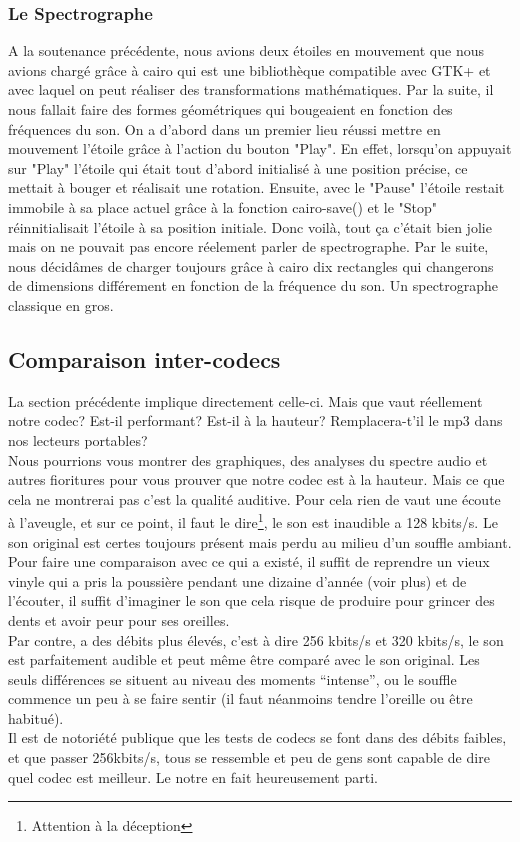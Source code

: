\documentclass[a4paper,12pt]{report}
\begin{document}
\subsubsection{Le Spectrographe}
A la soutenance précédente, nous avions deux étoiles en mouvement que nous
avions chargé grâce à cairo qui est une bibliothèque compatible avec GTK+ et avec
laquel on peut réaliser des transformations mathématiques. Par la suite, il nous
fallait faire des formes géométriques qui bougeaient en fonction des fréquences
du son. On a d'abord dans un premier lieu réussi mettre en mouvement l'étoile
grâce à l'action du bouton "Play". En effet, lorsqu'on appuyait sur "Play"
l'étoile qui était tout d'abord initialisé à une position précise, ce mettait à
bouger et réalisait une rotation. Ensuite, avec le "Pause" l'étoile restait
immobile à sa place actuel grâce à la fonction cairo-save() et le "Stop"
réinnitialisait l'étoile à sa position initiale. Donc voilà, tout ça c'était
bien jolie mais on ne pouvait pas encore réelement parler de spectrographe. Par
le suite, nous décidâmes de charger toujours grâce à cairo dix rectangles qui
changerons de dimensions différement en fonction de la fréquence du son. Un
spectrographe classique en gros. 
\subsection{Comparaison inter-codecs}
La section précédente implique directement celle-ci. Mais que vaut réellement
notre codec? Est-il performant? Est-il à la hauteur? Remplacera-t'il le mp3 dans
nos lecteurs portables?\\
Nous pourrions vous montrer des graphiques, des analyses du spectre audio et
autres fioritures pour vous prouver que notre codec est à la hauteur. Mais ce
que cela ne montrerai pas c'est la qualité auditive. Pour cela rien de vaut une
écoute à l'aveugle, et sur ce point, il faut le dire\footnote{Attention à la
déception}, le son est inaudible a 128 kbits/s. Le son original est certes
toujours présent mais perdu au milieu d'un souffle ambiant. Pour faire une
comparaison avec ce qui a existé, il suffit de reprendre un vieux vinyle qui a
pris la poussière pendant une dizaine d'année (voir plus) et de l'écouter, il
suffit d'imaginer le son que cela risque de produire pour grincer des dents et
avoir peur pour ses oreilles.\\
Par contre, a des débits plus élevés, c'est à dire 256 kbits/s et 320 kbits/s,
le son est parfaitement audible et peut même être comparé avec le son original.
Les seuls différences se situent au niveau des moments ``intense'', ou le
souffle commence un peu à se faire sentir (il faut néanmoins tendre l'oreille ou
être habitué).\\
Il est de notoriété publique que les tests de codecs se font dans des débits
faibles, et que passer 256kbits/s, tous se ressemble et peu de gens sont capable
de dire quel codec est meilleur. Le notre en fait heureusement parti.
\end{document}
